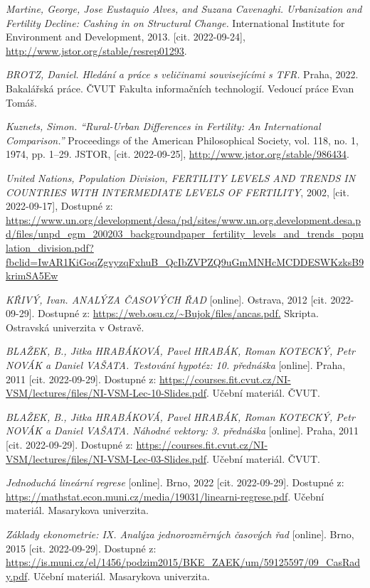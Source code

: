 \documentclass[thesis=M,czech]{FITthesis}[2022/10/08]
\begin{document}
\begin{thebibliography}{99}
 \textit{Martine, George, Jose Eustaquio Alves, and Suzana Cavenaghi. Urbanization and Fertility Decline: Cashing in on Structural Change.} International Institute for Environment and Development, 2013. [cit. 2022-09-24], \url{http://www.jstor.org/stable/resrep01293}.

 \textit{BROTZ, Daniel. Hledání a práce s veličinami souvisejícími s TFR.} Praha, 2022. Bakalářská práce. ČVUT Fakulta informačních technologií. Vedoucí práce Evan Tomáš.

 \textit{Kuznets, Simon. “Rural-Urban Differences in Fertility: An International Comparison.”} Proceedings of the American Philosophical Society, vol. 118, no. 1, 1974, pp. 1–29. JSTOR, [cit. 2022-09-25], \url{http://www.jstor.org/stable/986434}. 

\textit{United Nations, Population Division, FERTILITY LEVELS AND TRENDS IN COUNTRIES WITH INTERMEDIATE LEVELS OF FERTILITY}, 2002, [cit. 2022-09-17], Dostupné z: \url{https://www.un.org/development/desa/pd/sites/www.un.org.development.desa.pd/files/unpd_egm_200203_backgroundpaper_fertility_levels_and_trends_population_division.pdf?fbclid=IwAR1KiGoqZgvyzqFxhuB_QcIbZVPZQ9uGmMNHcMCDDESWKzksB9krimSA5Ew}

 \textit{KŘIVÝ, Ivan. ANALÝZA ČASOVÝCH ŘAD} [online]. Ostrava, 2012 [cit. 2022-09-29]. Dostupné z: \url{https://web.osu.cz/~Bujok/files/ancas.pdf.} Skripta. Ostravská univerzita v Ostravě.

 \textit{BLAŽEK, B., Jitka HRABÁKOVÁ, Pavel HRABÁK, Roman KOTECKÝ, Petr NOVÁK a Daniel VAŠATA. Testování hypotéz: 10. přednáška} [online]. Praha, 2011 [cit. 2022-09-29]. Dostupné z: \url{https://courses.fit.cvut.cz/NI-VSM/lectures/files/NI-VSM-Lec-10-Slides.pdf}. Učební materiál. ČVUT.

 \textit{BLAŽEK, B., Jitka HRABÁKOVÁ, Pavel HRABÁK, Roman KOTECKÝ, Petr NOVÁK a Daniel VAŠATA. Náhodné vektory: 3. přednáška} [online]. Praha, 2011 [cit. 2022-09-29]. Dostupné z: \url{https://courses.fit.cvut.cz/NI-VSM/lectures/files/NI-VSM-Lec-03-Slides.pdf}. Učební materiál. ČVUT.

 \textit{Jednoduchá lineární regrese} [online]. Brno, 2022 [cit. 2022-09-29]. Dostupné z: \url{https://mathstat.econ.muni.cz/media/19031/linearni-regrese.pdf}. Učební materiál. Masarykova univerzita.

 \textit{Základy ekonometrie: IX. Analýza jednorozměrných časových řad} [online]. Brno, 2015 [cit. 2022-09-29]. Dostupné z: \url{https://is.muni.cz/el/1456/podzim2015/BKE_ZAEK/um/59125597/09_CasRady.pdf}. Učební materiál. Masarykova univerzita.


\end{thebibliography}
\end{document}
